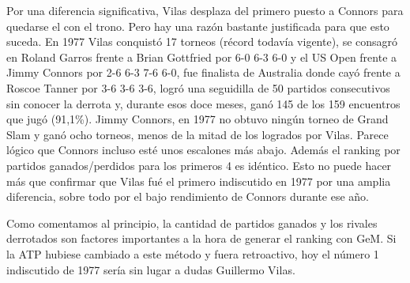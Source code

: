 Por una diferencia significativa, Vilas desplaza del primero puesto a Connors para quedarse el con el trono. Pero hay una razón bastante justificada para que esto suceda.
En 1977 Vilas conquistó 17 torneos (récord todavía vigente), se consagró en Roland Garros frente a Brian Gottfried por 6-0 6-3 6-0 y el US Open frente a Jimmy Connors por 2-6 6-3 7-6 6-0, fue finalista de Australia donde cayó frente a Roscoe Tanner por 3-6 3-6 3-6, logró una seguidilla de 50 partidos consecutivos sin conocer la derrota y, durante esos doce meses, ganó 145 de los 159 encuentros que jugó (91,1\%).
Jimmy Connors, en 1977 no obtuvo ningún torneo de Grand Slam y ganó ocho torneos, menos de la mitad de los logrados por Vilas. 
Parece lógico que Connors incluso esté unos escalones más abajo. Además el ranking por partidos ganados/perdidos para los primeros 4 es idéntico. Esto no puede hacer más que confirmar que Vilas fué el primero indiscutido en 1977 por una amplia diferencia, sobre todo por el bajo rendimiento de Connors durante ese año.

Como comentamos al principio, la cantidad de partidos ganados y los rivales derrotados son factores importantes a la hora de generar el ranking con GeM. Si la ATP hubiese cambiado a este método y fuera retroactivo, hoy el número 1 indiscutido de 1977 sería sin lugar a dudas Guillermo Vilas.

